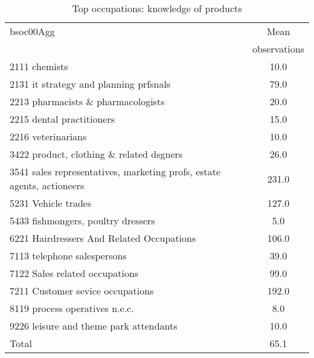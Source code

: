 \begin{table}
	\centering
	\caption{Top occupations: knowledge of products}
	\begin{tabular}{lc}
	\toprule	
		
bsoc00Agg&Mean \\
&observations \\
\hline
2111 chemists&10.0 \\
2131 it strategy and planning prfsnals&79.0 \\
2213 pharmacists \& pharmacologists&20.0 \\
2215 dental practitioners&15.0 \\
2216 veterinarians&10.0 \\
3422 product, clothing \& related dsgners&26.0 \\
3541 sales representatives, marketing profs, estate agents, actioneers&231.0 \\
5231 Vehicle trades&127.0 \\
5433 fishmongers, poultry dressers&5.0 \\
6221 Hairdressers And Related Occupations&106.0 \\
7113 telephone salespersons&39.0 \\
7122 Sales related occupations&99.0 \\
7211 Customer sevice occupations&192.0 \\
8119 process operatives n.e.c.&8.0 \\
9226 leisure and theme park attendants&10.0 \\
Total&65.1 \\
\bottomrule
\bottomrule
\end{tabular}
\end{table}

